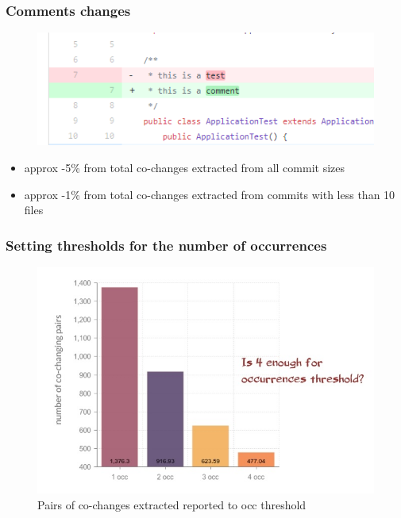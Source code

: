\documentclass{beamer}
\begin{document}
 \begin{frame}
\frametitle{Comments changes}
\vskip 0.2cm
\begin{center}
     \begin{figure}
	\includegraphics[width=\textwidth]{comment.PNG}
     \end{figure}
\end{center}
\vskip 0.4cm
\begin{itemize}
        \item approx -5\% from total co-changes extracted from all commit sizes
         \item approx -1\% from total co-changes extracted from commits with less than 10 files
\end{itemize}

\end{frame}


 \begin{frame}
\frametitle{Setting thresholds for the number of occurrences}
\vskip 0.2cm
\begin{center}
     \begin{figure}
	\includegraphics[width=\textwidth]{occ2.jpg}
	\caption{\label{fig:fig5}Pairs of co-changes extracted reported to occ threshold}
     \end{figure}
\end{center}
\end{frame}
\end{document}
